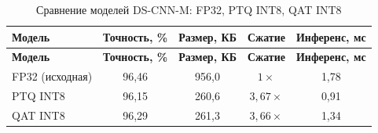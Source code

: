 \begin{longtable}{|l|c|c|c|c|}
	\caption{Сравнение моделей DS-CNN-M: FP32, PTQ INT8, QAT INT8}
	\label{tab:quant_results}                                                                               \\
	\hline
	\textbf{Модель} & \textbf{Точность, \%} & \textbf{Размер, КБ} & \textbf{Сжатие} & \textbf{Инференс, мс} \\
	\hline
	\endfirsthead
	\hline
	\textbf{Модель} & \textbf{Точность, \%} & \textbf{Размер, КБ} & \textbf{Сжатие} & \textbf{Инференс, мс} \\
	\hline
	\endhead
	\hline
	\endfoot
	FP32 (исходная) & 96,46                 & 956,0               & $1\times$       & 1,78                  \\
	\hline
	PTQ INT8        & 96,15                 & 260,6               & $3{,}67\times$  & 0,91                  \\
	\hline
	QAT INT8        & 96,29                 & 261,3               & $3{,}66\times$  & 1,34                  \\
	\hline
\end{longtable}
